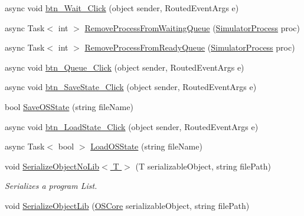 \begin{DoxyCompactItemize}
\item 
async void \hyperlink{class_c_p_u___o_s___simulator_1_1_operating_system_main_window_a37aa75fec8d0549b2fdecd8923dc5199}{btn\+\_\+\+Wait\+\_\+\+Click} (object sender, Routed\+Event\+Args e)
\item 
async Task$<$ int $>$ \hyperlink{class_c_p_u___o_s___simulator_1_1_operating_system_main_window_ab35fa19cff0ab2c2971008b00aaeaa3b}{Remove\+Process\+From\+Waiting\+Queue} (\hyperlink{class_c_p_u___o_s___simulator_1_1_operating___system_1_1_simulator_process}{Simulator\+Process} proc)
\item 
async Task$<$ int $>$ \hyperlink{class_c_p_u___o_s___simulator_1_1_operating_system_main_window_a31f51f4f01f0f79f46664d1765e426d1}{Remove\+Process\+From\+Ready\+Queue} (\hyperlink{class_c_p_u___o_s___simulator_1_1_operating___system_1_1_simulator_process}{Simulator\+Process} proc)
\item 
async void \hyperlink{class_c_p_u___o_s___simulator_1_1_operating_system_main_window_ad383b8a89f2ab3545c9347758581b851}{btn\+\_\+\+Queue\+\_\+\+Click} (object sender, Routed\+Event\+Args e)
\item 
async void \hyperlink{class_c_p_u___o_s___simulator_1_1_operating_system_main_window_a41de5410a79f29c686ae3c52cb733de1}{btn\+\_\+\+Save\+State\+\_\+\+Click} (object sender, Routed\+Event\+Args e)
\item 
bool \hyperlink{class_c_p_u___o_s___simulator_1_1_operating_system_main_window_aa67e96734f1d4af0d8efc422a60da4a5}{Save\+O\+S\+State} (string file\+Name)
\item 
async void \hyperlink{class_c_p_u___o_s___simulator_1_1_operating_system_main_window_a9cd76943bd0e2b5ad6b7f83ba54bf82e}{btn\+\_\+\+Load\+State\+\_\+\+Click} (object sender, Routed\+Event\+Args e)
\item 
async Task$<$ bool $>$ \hyperlink{class_c_p_u___o_s___simulator_1_1_operating_system_main_window_a82cf10b3c69de54a4eae248f683447c4}{Load\+O\+S\+State} (string file\+Name)
\item 
void \hyperlink{class_c_p_u___o_s___simulator_1_1_operating_system_main_window_aadb99eed63101f954835c42db8a47955}{Serialize\+Object\+No\+Lib$<$ T $>$} (T serializable\+Object, string file\+Path)
\begin{DoxyCompactList}\small\item\em Serializes a program List. \end{DoxyCompactList}\item 
void \hyperlink{class_c_p_u___o_s___simulator_1_1_operating_system_main_window_a066190e07e3b44d3d24da5e4a2122d8c}{Serialize\+Object\+Lib} (\hyperlink{class_c_p_u___o_s___simulator_1_1_operating___system_1_1_o_s_core}{O\+S\+Core} serializable\+Object, string file\+Path)

\end{DoxyCompactItemize}
